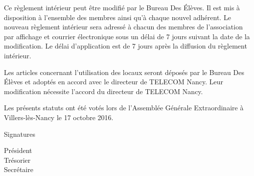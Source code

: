 \documentclass{article}
\begin{document}
		Ce règlement intérieur peut être modifié par le Bureau Des Élèves. Il est mis
		à disposition à l’ensemble des membres ainsi qu’à chaque nouvel adhérent. Le
		nouveau règlement intérieur sera adressé à chacun des membres de
		l'association par affichage et courrier électronique sous un délai de 7 jours
		suivant la date de la modification. Le délai d’application est de 7 jours
		après la diffusion du règlement intérieur.

		Les articles concernant l’utilisation des locaux seront déposés par le Bureau
		Des Élèves et adoptés en accord avec le directeur de TELECOM Nancy.	Leur
		modification nécessite l’accord du directeur de TELECOM Nancy.

	\vspace*{5cm}
	\begin{center}
		{\large\light Les présents statuts ont été votés lors de l’Assemblée Générale
		Extraordinaire à Villers-lès-Nancy le 17 octobre 2016.}
	\end{center}
    \vspace{3cm}
	Signatures\par
	\begin{multicols}{3}
	    \begin{center}
	        Président \\
	        Trésorier \\
	        Secrétaire
	    \end{center}
	\end{multicols}
    
\end{document}
